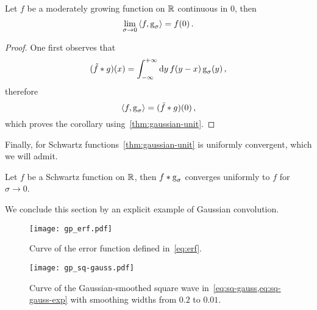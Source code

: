 \begin{corollary}
  \label{cor:gauss-sample}
  Let $f$ be a moderately growing function on $\mathbb{R}$ continuous in $0$, then
  \begin{equation}
    \lim_{\sigma\to0}\braket{f,\operatorname{g}_{\sigma}}=f(0)\,.
  \end{equation}
\end{corollary}
\begin{proof}
  One first observes that
  \begin{equation}
    (\tilde{f}\ast g)(x)=\int_{-\infty}^{+\infty}\mathrm{d}{y}\,f(y-x)\operatorname{g}_{\sigma}(y)\,,
  \end{equation}
  therefore
  \begin{equation}
    \braket{f,\operatorname{g}_{\sigma}}=(\tilde{f}\ast g)(0)\,,
  \end{equation}
  which proves the corollary using~\cref{thm:gaussian-unit}.
\end{proof}
Finally, for Schwartz functions~\cref{thm:gaussian-unit} is uniformly convergent, which we
will admit.
\begin{theorem}
  Let $f$ be a Schwartz function on $\mathbb{R}$, then $f\ast \operatorname{g}_{\sigma}$ converges uniformly
  to $f$ for $\sigma\to 0$.
\end{theorem}
We conclude this section by an explicit example of Gaussian convolution.
\begin{figure}[t]
  \centering
  \texttt{[image: gp\_erf.pdf]}
  \caption{Curve of the error function defined in~\cref{eq:erf}.}
  \label{fig:erf}
\end{figure}
\begin{figure}[htbp]
  \centering
  \texttt{[image: gp\_sq-gauss.pdf]}
  \caption{Curve of the Gaussian-smoothed square wave
  in~\cref{eq:sq-gauss,eq:sq-gauss-exp} with smoothing widths from $0.2$ to $0.01$.}
  \label{fig:sq-gauss}
\end{figure}
